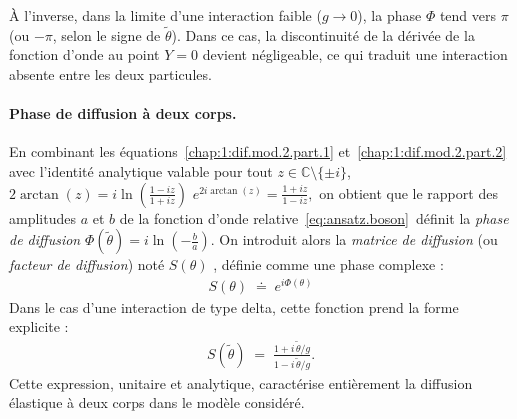 À l’inverse, dans la limite d’une interaction faible (\( g \to 0 \)), la phase \( \Phi \) tend vers \( \pi \) (ou \( -\pi \), selon le signe de \( \tilde{\theta} \)). Dans ce cas, la discontinuité de la dérivée de la fonction d’onde au point \( Y = 0 \) devient négligeable, ce qui traduit une interaction absente entre les deux particules.




\paragraph{Phase de diffusion à deux corps.}

En combinant les équations~\eqref{chap:1:dif.mod.2.part.1} et~\eqref{chap:1:dif.mod.2.part.2} avec l’identité analytique valable pour tout
\(z \in \mathbb{C}\setminus\{\pm i\}\),
\(
2\arctan(z)=i\ln\!\left(\frac{1-iz}{1+iz}\right)
\)
\ie 
\(
e^{2i\arctan(z)}=\frac{1+iz}{1-iz},
\)
on obtient que le rapport des amplitudes \(a\) et \(b\) de la fonction
d’onde relative~\eqref{eq:ansatz.boson} définit la {\em phase de diffusion }
\(
\Phi(\tilde{\theta}) = i\ln\!\left(-\frac{b}{a}\right).
\)
On introduit alors la {\em matrice de diffusion} (ou {\em facteur de diffusion}) noté  \(S(\theta) \) , définie comme une phase complexe : 
\begin{eqnarray}\label{chap:1:def.mat.dif.1}
	S(\theta) \;\doteq\; e^{i\Phi(\theta)}	
\end{eqnarray}
Dans le cas d’une interaction de type delta, cette fonction prend la forme explicite :
\begin{eqnarray}\label{chap:1:dif.mod.2.part.3}
	S(\tilde{\theta}) \; = \; \frac{1 + i\,\tilde{\theta}/g}{1 - i\,\tilde{\theta}/g}.%
\end{eqnarray}
Cette expression, unitaire et analytique, caractérise entièrement la diffusion élastique à deux corps dans le modèle considéré.



